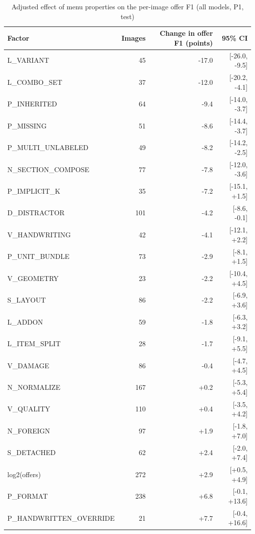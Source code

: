 \begin{table}[t]
\centering
\caption{Adjusted effect of menu properties on the per-image offer F1 (all models, P1, test)}
\label{tab:difficulty}
\small
\begin{tabular}{lrrr}
\toprule
Factor & Images & Change in offer F1 (points) & 95\% CI \\
\midrule
L\_VARIANT & 45 & -17.0 & [-26.0, -9.5] \\
L\_COMBO\_SET & 37 & -12.0 & [-20.2, -4.1] \\
P\_INHERITED & 64 & -9.4 & [-14.0, -3.7] \\
P\_MISSING & 51 & -8.6 & [-14.4, -3.7] \\
P\_MULTI\_UNLABELED & 49 & -8.2 & [-14.2, -2.5] \\
N\_SECTION\_COMPOSE & 77 & -7.8 & [-12.0, -3.6] \\
P\_IMPLICIT\_K & 35 & -7.2 & [-15.1, +1.5] \\
D\_DISTRACTOR & 101 & -4.2 & [-8.6, -0.1] \\
V\_HANDWRITING & 42 & -4.1 & [-12.1, +2.2] \\
P\_UNIT\_BUNDLE & 73 & -2.9 & [-8.1, +1.5] \\
V\_GEOMETRY & 23 & -2.2 & [-10.4, +4.5] \\
S\_LAYOUT & 86 & -2.2 & [-6.9, +3.6] \\
L\_ADDON & 59 & -1.8 & [-6.3, +3.2] \\
L\_ITEM\_SPLIT & 28 & -1.7 & [-9.1, +5.5] \\
V\_DAMAGE & 86 & -0.4 & [-4.7, +4.5] \\
N\_NORMALIZE & 167 & +0.2 & [-5.3, +5.4] \\
V\_QUALITY & 110 & +0.4 & [-3.5, +4.2] \\
N\_FOREIGN & 97 & +1.9 & [-1.8, +7.0] \\
S\_DETACHED & 62 & +2.4 & [-2.0, +7.4] \\
log2(offers) & 272 & +2.9 & [+0.5, +4.9] \\
P\_FORMAT & 238 & +6.8 & [-0.1, +13.6] \\
P\_HANDWRITTEN\_OVERRIDE & 21 & +7.7 & [-0.4, +16.6] \\
\bottomrule
\end{tabular}
\par{}
\end{table}
